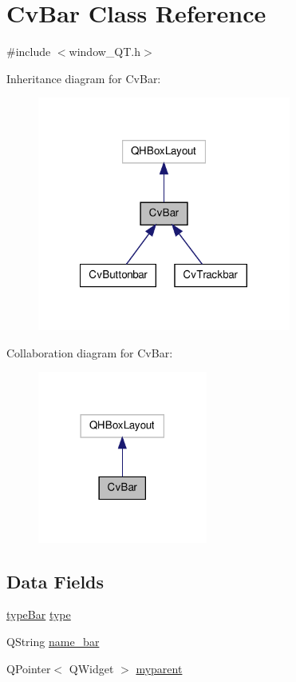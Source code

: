 \hypertarget{classCvBar}{\section{Cv\-Bar Class Reference}
\label{classCvBar}
}


{\ttfamily \#include $<$window\-\_\-\-Q\-T.\-h$>$}



Inheritance diagram for Cv\-Bar\-:
\nopagebreak
\begin{figure}[H]
\begin{center}
\leavevmode
\includegraphics[width=236pt]{classCvBar__inherit__graph}
\end{center}
\end{figure}


Collaboration diagram for Cv\-Bar\-:
\nopagebreak
\begin{figure}[H]
\begin{center}
\leavevmode
\includegraphics[width=158pt]{classCvBar__coll__graph}
\end{center}
\end{figure}
\subsection*{Data Fields}
\begin{DoxyCompactItemize}
\item 
\hyperlink{window__QT_8h_a4003d2816fd898b0f71eb5addfe80af3}{type\-Bar} \hyperlink{classCvBar_a64329aa3255c2c98a36f3f887a939b40}{type}
\item 
Q\-String \hyperlink{classCvBar_a6970f0eae76786143e2df415681d0a6f}{name\-\_\-bar}
\item 
Q\-Pointer$<$ Q\-Widget $>$ \hyperlink{classCvBar_af6fa35b8c9f4aed557854fc3aa80a040}{myparent}
\end{DoxyCompactItemize}


